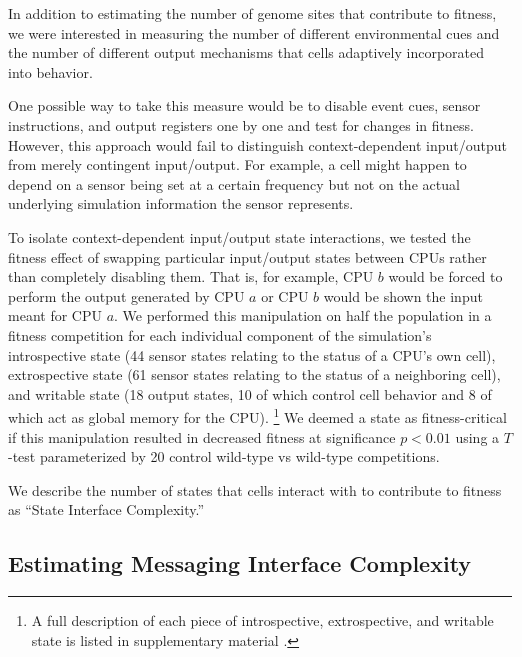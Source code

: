 In addition to estimating the number of genome sites that contribute to fitness, we were interested in measuring the number of different environmental cues and the number of different output mechanisms that cells adaptively incorporated into behavior.

One possible way to take this measure would be to disable event cues, sensor instructions, and output registers one by one and test for changes in fitness.
However, this approach would fail to distinguish context-dependent input/output from merely contingent input/output.
For example, a cell might happen to depend on a sensor being set at a certain frequency but not on the actual underlying simulation information the sensor represents.

To isolate context-dependent input/output state interactions, we tested the fitness effect of swapping particular input/output states between CPUs rather than completely disabling them.
That is, for example, CPU $b$ would be forced to perform the output generated by CPU $a$ or CPU $b$ would be shown the input meant for CPU $a$.
We performed this manipulation on half the population in a fitness competition for each individual component of the simulation's introspective state (44 sensor states relating to the status of a CPU's own cell), extrospective state (61 sensor states relating to the status of a neighboring cell), and writable state (18 output states, 10 of which control cell behavior and 8 of which act as global memory for the CPU).
\footnote{
A full description of each piece of introspective, extrospective, and writable state is listed in supplementary material \citep{Moreno_2021}.
}
We deemed a state as fitness-critical if this manipulation resulted in decreased fitness at significance $p < 0.01$ using a $T$-test parameterized by 20 control wild-type vs wild-type competitions.

We describe the number of states that cells interact with to contribute to fitness as ``State Interface Complexity.''

\subsection{Estimating Messaging Interface Complexity}
\label{sec:estimating-messaging-interface-complexity;ch:measuring-cna}

